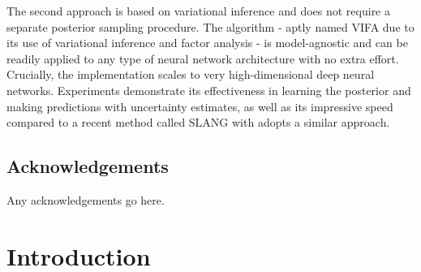\documentclass[msc,deptreport.inf]{infthesis} %
\begin{document}
\begin{preliminary}
{The second approach is based on variational inference and does not require a separate posterior sampling procedure. The algorithm - aptly named VIFA due to its use of variational inference and factor analysis - is model-agnostic and can be readily applied to any type of neural network architecture with no extra effort. Crucially, the implementation scales to very high-dimensional deep neural networks. Experiments demonstrate its effectiveness in learning the posterior and making predictions with uncertainty estimates, as well as its impressive speed compared to a recent method called SLANG with adopts a similar approach. 
}

\maketitle

\section*{Acknowledgements}
Any acknowledgements go here.

\tableofcontents
\end{preliminary}


\chapter{Introduction}

%
%
%
%
\end{document}
